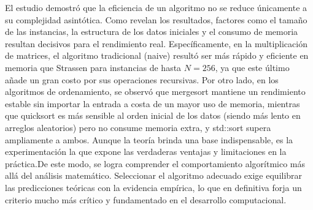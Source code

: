 El estudio demostró que la eficiencia de un algoritmo no se reduce únicamente a su complejidad asintótica. Como revelan los resultados, factores como el tamaño de las instancias, la estructura de los datos iniciales y el consumo de memoria resultan decisivos para el rendimiento real. Específicamente, en la multiplicación de matrices, el algoritmo tradicional (naive) resultó ser más rápido y eficiente en memoria que Strassen para instancias de hasta $N=256$, ya que este último añade un gran costo por sus operaciones recursivas. Por otro lado, en los algoritmos de ordenamiento, se observó que mergesort mantiene un rendimiento estable sin importar la entrada a costa de un mayor uso de memoria, mientras que quicksort es más sensible al orden inicial de los datos (siendo más lento en arreglos aleatorios) pero no consume memoria extra, y std::sort supera ampliamente a ambos. Aunque la teoría brinda una base indispensable, es la experimentación la que expone las verdaderas ventajas y limitaciones en la práctica.\vspace{0.5cm}De este modo, se logra comprender el comportamiento algorítmico más allá del análisis matemático. Seleccionar el algoritmo adecuado exige equilibrar las predicciones teóricas con la evidencia empírica, lo que en definitiva forja un criterio mucho más crítico y fundamentado en el desarrollo computacional.